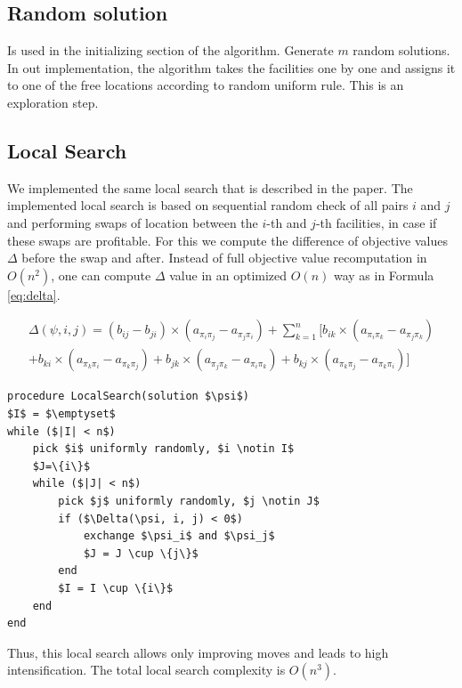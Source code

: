 \documentclass[12pt]{article}
\begin{document}
\subsection{Random solution}
Is used in the initializing section of the algorithm. Generate $m$ random solutions. In out implementation, the algorithm takes the facilities one by one and assigns it to one of the free locations according to random uniform rule. This is an exploration step.

\subsection{Local Search}

We implemented the same local search that is described in the paper. The implemented local search is based on sequential random check of all pairs $i$ and $j$ and performing swaps of location between the $i$-th and $j$-th facilities, in case if these swaps are profitable. For this we compute the difference of objective values $\Delta$ before the swap and after. Instead of full objective value recomputation in $O(n^2)$, one can compute $\Delta$ value in an optimized $O(n)$ way as in Formula \ref{eq:delta}.

\begin{multline}
\Delta(\psi,i,j) = (b_{ij} - b_{ji}) \times (a_{\pi_i\pi_j} - a_{\pi_j\pi_i}) + \sum_{k = 1}^{n} [b_{ik} \times (a_{\pi_i\pi_k} - a_{\pi_j\pi_k}) \\+ b_{ki} \times (a_{\pi_k\pi_i} - a_{\pi_k\pi_j}) 
 + b_{jk} \times (a_{\pi_j\pi_k} - a_{\pi_i\pi_k}) + b_{kj} \times (a_{\pi_k\pi_j} - a_{\pi_k\pi_i})]
\label{eq:delta}
\end{multline}

\begin{minipage}[c]{0.95\textwidth}
\begin{lstlisting}[caption={Local Search pseudo-code}, label={lst:local-search},mathescape]
procedure LocalSearch(solution $\psi$)
$I$ = $\emptyset$
while ($|I| < n$)
	pick $i$ uniformly randomly, $i \notin I$
	$J=\{i\}$
	while ($|J| < n$)
		pick $j$ uniformly randomly, $j \notin J$
		if ($\Delta(\psi, i, j) < 0$)
			exchange $\psi_i$ and $\psi_j$
			$J = J \cup \{j\}$
		end
		$I = I \cup \{i\}$
	end
end
\end{lstlisting}
\end{minipage}

Thus, this local search allows only improving moves and leads to high intensification. The total local search complexity is $O(n^3)$.
\end{document}
